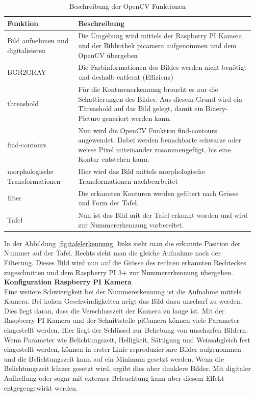 \documentclass[../../main.tex]{subfiles}
\begin{document}
    \begin{table}[H]
        \begin{flushleft}
            \begin{tabular}{ | p{3cm} | p{10.5cm} |}
                \hline
                \textbf{Funktion}  & \textbf{Beschreibung} \\\hline
                Bild aufnehmen und digitalisieren & Die Umgebung wird mittels der Raspberry PI Kamera und der Bibliothek picamera aufgenommen und dem OpenCV übergeben \\\hline
                BGR2GRAY & Die Farbinformationen des Bildes werden nicht benötigt und deshalb entfernt (Effizienz) \\ \hline
                threashold & Für die Konturenerkennung braucht es nur die Schattierungen des Bildes. Aus diesem Grund wird ein Threashold auf das Bild gelegt, damit ein Binery-Picture generiert werden kann. \\ \hline
                find-contours & Nun wird die OpenCV Funktion find-contours angewendet. Dabei werden benachbarte schwarze oder weisse Pixel miteinander zusammengefügt, bis eine Kontur entstehen kann. \\ \hline
                morphologische Transformationen & Hier wird das Bild mittels morphologische Transformationen nachbearbeitet \\ \hline
                filter & Die erkannten Konturen werden gefiltert nach Grösse und Form der Tafel. \\ \hline
                Tafel & Nun ist das Bild mit der Tafel erkannt worden und wird zur Nummererkennung vorbereitet. \\ \hline
            \end{tabular}
        \end{flushleft}
        \caption{Beschreibung der OpenCV Funktionen}
        \label{tab:OpenCV_Funktionen_Tafelerkennung}
     \end{table}

     In der Abbildung \ref{fig:tafelerkennung} links sieht man die erkannte Position der Nummer auf der Tafel. Rechts sieht man die gleiche Aufnahme nach der Filterung. Dieses Bild wird nun auf die Grösse des rechten erkannten Rechteckes zugeschnitten und dem Raspberry PI 3+ zur Nummererkennung übergeben.\\

     \textbf{Konfiguration Raspberry PI Kamera}\\
     Eine weitere Schwierigkeit bei der Nummererkennung ist die Aufnahme mittels Kamera. Bei hohen Geschwindigkeiten neigt das Bild dazu unscharf zu werden. Dies liegt daran, dass die Verschlusszeit der Kamera zu lange ist. Mit der Raspberry PI Kamera und der Schnittstelle piCamera können viele Parameter eingestellt werden. Hier liegt der Schlüssel zur Behebung von unscharfen Bildern. Wenn Parameter wie Belichtungszeit, Helligkeit, Sättigung und Weissabgleich fest eingestellt werden, können in erster Linie reproduzierbare Bilder aufgenommen und die Belichtungszeit kann auf ein Minimum gesetzt werden. Wenn die Belichtungszeit kürzer gesetzt wird, ergibt dies aber dunklere Bilder. Mit digitaler Aufhellung oder sogar mit externer Beleuchtung kann aber diesem Effekt entgegengewirkt werden.
\end{document}

